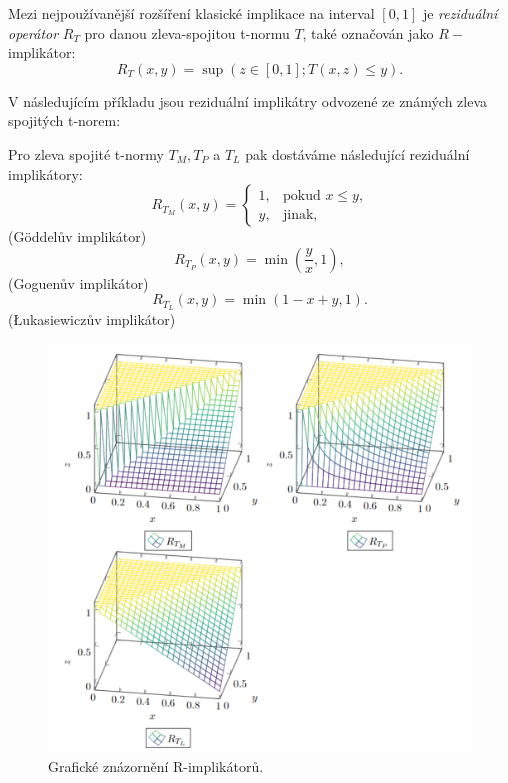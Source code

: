 Mezi nejpoužívanější rozšíření klasické implikace na interval $[0,1]$ je \textit{reziduální operátor} $R_T$ pro danou zleva-spojitou t-normu $T$, také označován jako $R-$implikátor: $$ R_T(x,y)=\sup(z \in [0,1]; T(x,z) \leq y).$$

V následujícím příkladu jsou rezidu\'aln\'i implik\'atry odvozen\'e ze zn\'am\'ych zleva spojit\'ych t-norem:
\begin{example} Pro zleva spojité t-normy $T_M, T_P$ a $T_L$ pak dostáváme  následující reziduální implikátory:
    \cite{Springer}\\
     $$ R_{T_M}(x,y)=\begin{cases} 1, &\mbox {pokud $x\leq y$,} \\y, &\mbox{jinak,} \end{cases} $$
    (Göddel\r uv implik\' ator)
     $$ R_{T_P}(x,y)=\min \left (\frac yx,1 \right ),$$
    (Goguen\r uv implikátor)
     $$ R_{T_L}(x,y)=\min(1-x+y,1).$$
    (\L{}ukasiewicz\r uv implikátor)\\
\end{example}

     
\begin{figure}[H]
\caption{Grafické znázornění R-implikátor\r u.\\}
                \hspace{-1cm}
                \includegraphics[scale=0.6]{template-fig/impl4.pdf}
                \centering
            \end{figure}



